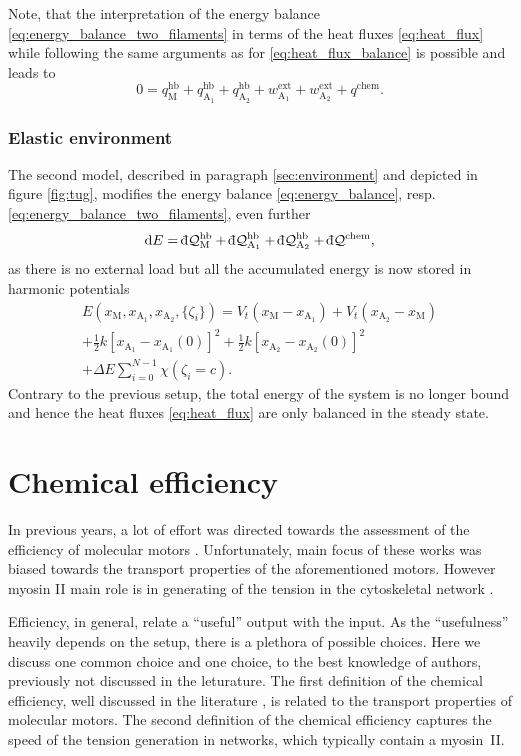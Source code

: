 \documentclass[aps,pre,twocolumn,showpacs,showkeys,superscriptaddress,floatfix]{revtex4-1}
\newcommand{\rmd}{{\mathrm d}}
\newcommand{\dbar}{{\mathchar '26 \mkern-11mu {\mathrm d}}}
\begin{document}
Note, that the interpretation of the energy balance \eqref{eq:energy_balance_two_filaments} in terms of the heat fluxes \eqref{eq:heat_flux}
while following the same arguments as for \eqref{eq:heat_flux_balance} is possible and leads to   
\[
0 = q_\text{M}^\text{hb} + q_{\text{A}_1}^\text{hb} + q_{\text{A}_2}^\text{hb} + w^\text{ext}_{\text{A}_1} + w^\text{ext}_{\text{A}_2} + q^\text{chem} .
\]

\subsubsection{Elastic environment}
The second model, described in paragraph \ref{sec:environment} and depicted in figure \ref{fig:tug}, 
modifies the energy balance \eqref{eq:energy_balance}, resp. \eqref{eq:energy_balance_two_filaments}, even further
\begin{equation*}
\rmd E = \dbar {\mathcal Q}_\text{M}^\text{hb} + \dbar {\mathcal Q}_{\text{A}_1}^\text{hb} + \dbar {\mathcal Q}_{\text{A}_2}^\text{hb} + \dbar {\mathcal Q}^\text{chem}, 
\end{equation*}
as there is no external load but all the accumulated energy is now stored in harmonic potentials 
\begin{multline*}
E( x_\text{M}, x_{\text{A}_1}, x_{\text{A}_2}, \{ \zeta_i \}) 
= V_t( x_\text{M} - x_{\text{A}_1} ) 
+ V_t( x_{\text{A}_2} - x_\text{M} ) 
\\
+ \frac{1}{2} k \left[ x_{\text{A}_1} - x_{\text{A}_1}(0) \right]^2 
+ \frac{1}{2} k \left[ x_{\text{A}_2} - x_{\text{A}_2}(0) \right]^2 
\\
+ \Delta E \sum\limits_{i=0}^{N-1} \chi( \zeta_i = c ) .
\end{multline*}
Contrary to the previous setup, the total energy of the system is no longer bound and hence the heat fluxes \eqref{eq:heat_flux} are only balanced in the steady state. 

\section{Chemical efficiency} 
\label{sec:efficiency}
In previous years, a lot of effort was directed towards the assessment of the efficiency of molecular motors \cite{}. %
Unfortunately, main focus of these works was biased towards the transport properties of the aforementioned motors. 
However myosin II main role is in generating of the tension in the cytoskeletal network \cite{}. %

Efficiency, in general, relate a ``useful'' output with the input.
As the ``usefulness'' heavily depends on the setup, there is a plethora of possible choices.
Here we discuss one common choice and one choice, to the best knowledge of authors, previously not discussed in the leturature. 
The first definition of the chemical efficiency, well discussed in the literature \cite{}, is related to the transport properties of molecular motors. 
The second definition of the chemical efficiency captures the speed of the tension generation in networks, which typically contain a myosin~II. 
\end{document}
